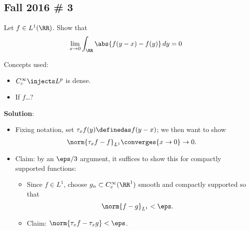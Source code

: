 \hypertarget{fall-2016-3}{%
\subsection{Fall 2016 \# 3}\label{fall-2016-3}}

Let \(f\in L^1(\RR)\). Show that
\begin{align*}
\lim _{x \to 0} \int _{\RR} \abs{f(y-x)-f(y)} \, dy = 0
\end{align*} 

\begin{solution}

Concepts used:

\begin{itemize}
\tightlist
\item
  \(C_c^\infty \injects L^p\) is dense.
\item
  If \(f\)\ldots?
\end{itemize}

\textbf{Solution}:

\begin{itemize}
\tightlist
\item
  Fixing notation, set \(\tau_x f(y) \definedas f(y-x)\); we then want
  to show
  \begin{align*}  
  \norm{\tau_x f -f}_{L^1} \converges{x\to 0}\to 0
  .\end{align*}
\item
  Claim: by an \(\eps/3\) argument, it suffices to show this for
  compactly supported functions:

  \begin{itemize}
  \tightlist
  \item
    Since \(f\in L^1\), choose \(g_n\subset C_c^\infty(\RR^1)\) smooth
    and compactly supported so that
    \begin{align*}\norm{f-g}_{L^1} < \eps.\end{align*}
  \item
    Claim: \(\norm{\tau_x f - \tau_x g} < \eps\).


\end{itemize}
\end{itemize}
\end{solution}
